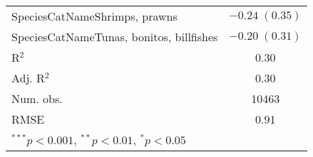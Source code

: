 \documentclass[]{article}
\begin{document}
\begin{table}[h]
\begin{center}
\begin{tabular}{l c }
SpeciesCatNameShrimps, prawns               & $-0.24 \; (0.35)$       \\
SpeciesCatNameTunas, bonitos, billfishes    & $-0.20 \; (0.31)$       \\
\hline
R$^2$                                       & 0.30                    \\
Adj. R$^2$                                  & 0.30                    \\
Num. obs.                                   & 10463                   \\
RMSE                                        & 0.91                    \\
\hline
\multicolumn{2}{l}{\scriptsize{$^{***}p<0.001$, $^{**}p<0.01$, $^*p<0.05$}}
\end{tabular}
\label{table:coefficients}
\end{center}
\end{table}
\end{document}
